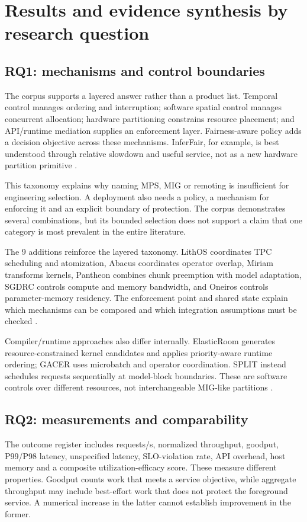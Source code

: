

\section{Results and evidence synthesis by research question}
\subsection{RQ1: mechanisms and control boundaries}
The corpus supports a layered answer rather than a product list. Temporal control manages ordering and interruption; software spatial control manages concurrent allocation; hardware partitioning constrains resource placement; and API/runtime mediation supplies an enforcement layer. Fairness-aware policy adds a decision objective across these mechanisms. InferFair, for example, is best understood through relative slowdown and useful service, not as a new hardware partition primitive \cite{P018}.

This taxonomy explains why naming MPS, MIG or remoting is insufficient for engineering selection. A deployment also needs a policy, a mechanism for enforcing it and an explicit boundary of protection. The corpus demonstrates several combinations, but its bounded selection does not support a claim that one category is most prevalent in the entire literature.

The 9 additions reinforce the layered taxonomy. LithOS coordinates TPC scheduling and atomization, Abacus coordinates operator overlap, Miriam transforms kernels, Pantheon combines chunk preemption with model adaptation, SGDRC controls compute and memory bandwidth, and Oneiros controls parameter-memory residency. The enforcement point and shared state explain which mechanisms can be composed and which integration assumptions must be checked \cite{s021,s022,s023,s024,s025,s026}.

Compiler/runtime approaches also differ internally. ElasticRoom generates resource-constrained kernel candidates and applies priority-aware runtime ordering; GACER uses microbatch and operator coordination. SPLIT instead schedules requests sequentially at model-block boundaries. These are software controls over different resources, not interchangeable MIG-like partitions \cite{s027,s028,s029}.

\subsection{RQ2: measurements and comparability}
The outcome register includes requests/s, normalized throughput, goodput, P99/P98 latency, unspecified latency, SLO-violation rate, API overhead, host memory and a composite utilization-efficacy score. These measure different properties. Goodput counts work that meets a service objective, while aggregate throughput may include best-effort work that does not protect the foreground service. A numerical increase in the latter cannot establish improvement in the former.

